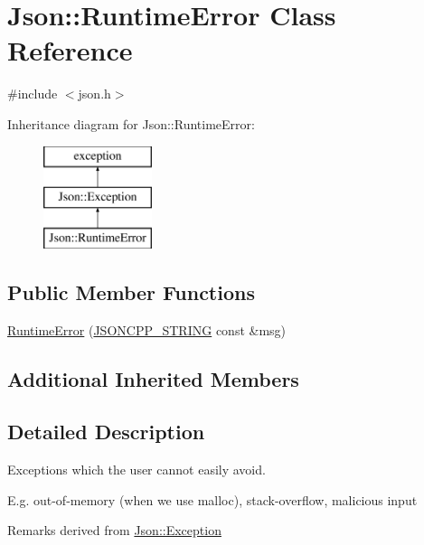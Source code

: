 \hypertarget{classJson_1_1RuntimeError}{}\section{Json\+:\+:Runtime\+Error Class Reference}
\label{classJson_1_1RuntimeError}


{\ttfamily \#include $<$json.\+h$>$}

Inheritance diagram for Json\+:\+:Runtime\+Error\+:\begin{figure}[H]
\begin{center}
\leavevmode
\includegraphics[height=3.000000cm]{classJson_1_1RuntimeError}
\end{center}
\end{figure}
\subsection*{Public Member Functions}
\begin{DoxyCompactItemize}
\item 
\hyperlink{classJson_1_1RuntimeError_a0f6445dc345ce0a703610b6e893fee40_a0f6445dc345ce0a703610b6e893fee40}{Runtime\+Error} (\hyperlink{json_8h_a1e723f95759de062585bc4a8fd3fa4be_a1e723f95759de062585bc4a8fd3fa4be}{J\+S\+O\+N\+C\+P\+P\+\_\+\+S\+T\+R\+I\+NG} const \&msg)
\end{DoxyCompactItemize}
\subsection*{Additional Inherited Members}


\subsection{Detailed Description}
Exceptions which the user cannot easily avoid.

E.\+g. out-\/of-\/memory (when we use malloc), stack-\/overflow, malicious input

\begin{DoxyRemark}{Remarks}
derived from \hyperlink{classJson_1_1Exception}{Json\+::\+Exception} 
\end{DoxyRemark}


